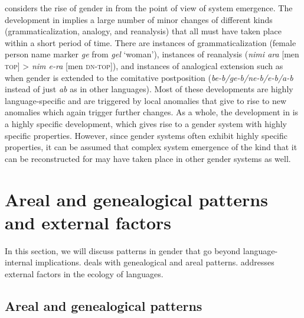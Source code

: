 \documentclass[output=collectionpaper]{langsci/langscibook}
\begin{document}
\cite{Waelchli2018} considers the rise of gender in  from the point of view of system emergence. The development in  implies a large number of minor changes of different kinds (grammaticalization, analogy, and reanalysis) that all must have taken place within a short period of time. There are instances of grammaticalization (female person name marker \textit{ge} from \textit{gel} `woman'), instances of reanalysis (\textit{nimi ara} [men \textsc{top}] > \textit{nim e-ra} [men \textsc{dn-top}]), and instances of analogical extension such as when gender is extended to the comitative postposition (\textit{be-b/ge-b/ne-b/e-b/a-b} instead of just \textit{ab} as in other  languages). Most of these developments are highly language-specific and are triggered by local anomalies that give to rise to new anomalies which again trigger further changes. As a whole, the development in  is a highly specific development, which gives rise to a gender system with highly specific properties. However, since gender systems often exhibit highly specific properties, it can be assumed that complex system emergence of the kind that it can be reconstructed for  may have taken place in other gender systems as well.

\section{Areal and genealogical patterns and external factors}
\label{sec:WDG:11}

In this section, we will discuss patterns in gender that go beyond language-internal implications.  deals with genealogical and areal patterns.  addresses external factors in the ecology of languages.

  \subsection{Areal and genealogical patterns}
  \label{sec:WDG:11.1}
\end{document}
